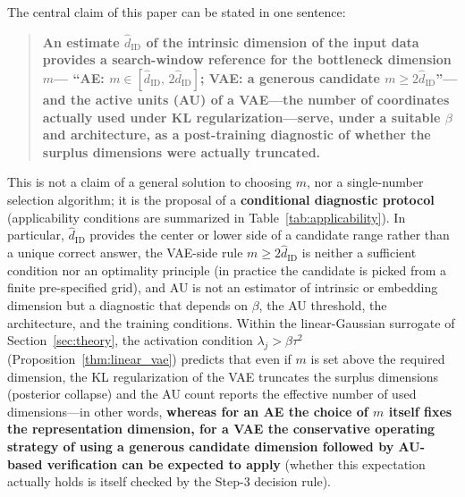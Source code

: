 \documentclass[make,article,submit,pdftex,moreauthors]{Definitions/mdpi}
\newcommand{\hatdID}{\hat{d}_{\mathrm{ID}}}
\begin{document}
The central claim of this paper can be stated in one sentence:
\begin{quote}
\textbf{An estimate $\hatdID$ of the intrinsic dimension of the input data
provides a search-window reference for the bottleneck dimension $m$---%
``AE: $m \in [\hatdID,\, 2\hatdID]$; VAE: a generous candidate
$m \geq 2\hatdID$''---and the active units (AU) of a VAE---the number of
coordinates actually used under KL regularization---serve, under a suitable
$\beta$ and architecture, as a post-training diagnostic of whether the
surplus dimensions were actually truncated.}
\end{quote}
This is not a claim of a general solution to choosing $m$, nor a
single-number selection algorithm; it is the proposal of a
\textbf{conditional diagnostic protocol}
(applicability conditions are summarized in
Table~\ref{tab:applicability}).
In particular, $\hatdID$ provides the center or lower side of a candidate
range rather than a unique correct answer, the VAE-side rule
$m \geq 2\hatdID$ is neither a sufficient condition nor an optimality
principle (in practice the candidate is picked from a finite pre-specified
grid), and AU is not an estimator of intrinsic or embedding dimension but a
diagnostic that depends on $\beta$, the AU threshold, the architecture, and
the training conditions.
Within the linear-Gaussian surrogate of Section~\ref{sec:theory}, the
activation condition $\lambda_j > \beta\tau^2$
(Proposition~\ref{thm:linear_vae}) predicts that even if $m$ is set above
the required dimension, the KL regularization of the VAE truncates the
surplus dimensions (posterior collapse) and the AU count reports the
effective number of used dimensions---in other words,
\textbf{whereas for an AE the choice of $m$ itself fixes the representation
dimension, for a VAE the conservative operating strategy of using a generous
candidate dimension followed by AU-based verification can be expected to
apply} (whether this expectation actually holds is
itself checked by the Step-3 decision rule).
\end{document}

